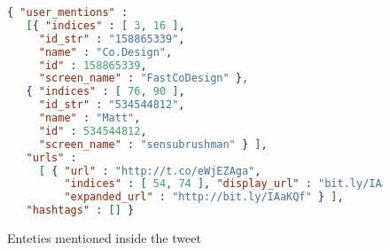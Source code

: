  \begin{figure}
  \centering
    \begin{lstlisting}[language=json,firstnumber=1]
 { "user_mentions" : 
   [{ "indices" : [ 3, 16 ], 
     "id_str" : "158865339",
     "name" : "Co.Design",
     "id" : 158865339,
     "screen_name" : "FastCoDesign" },
   { "indices" : [ 76, 90 ], 
     "id_str" : "534544812",
     "name" : "Matt",
     "id" : 534544812,
     "screen_name" : "sensubrushman" } ],
   "urls" :
     [ { "url" : "http://t.co/eWjEZAga",
         "indices" : [ 54, 74 ], "display_url" : "bit.ly/IAaKQf",
         "expanded_url" : "http://bit.ly/IAaKQf" } ],
   "hashtags" : [] }
    \end{lstlisting}
  \caption{Enteties mentioned inside the tweet}
  \label{fig:tweet_enteties}
\end{figure}

